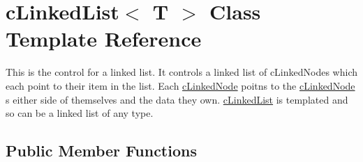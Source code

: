 \hypertarget{classc_linked_list}{
\section{cLinkedList$<$ T $>$ Class Template Reference}
\label{classc_linked_list}
}


This is the control for a linked list. It controls a linked list of cLinkedNodes which each point to their item in the list. Each \hyperlink{classc_linked_node}{cLinkedNode} poitns to the \hyperlink{classc_linked_node}{cLinkedNode} s either side of themselves and the data they own. \hyperlink{classc_linked_list}{cLinkedList} is templated and so can be a linked list of any type.  


\subsection*{Public Member Functions}
